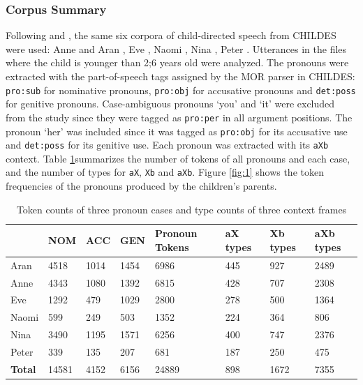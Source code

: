 \subsubsection{Corpus Summary}
Following \citet{mintz2003frequent} and \citet{clair2010learning}, the same six corpora of child-directed speech from CHILDES \cite{macwhinney2014childes} were used: Anne and Aran \cite{theakston2001}, Eve \cite{brown1973first}, Naomi \cite{sachs1983talking}, Nina \cite{suppes1974semantics}, Peter \cite{bloom1974imitation}. Utterances in the files where the child is younger than 2;6 years old were analyzed. The pronouns were extracted with the part-of-speech tags assigned by the MOR parser \cite{macwhinney2012morphosyntactic} in CHILDES: \texttt{pro:sub} for nominative pronouns, \texttt{pro:obj} for accusative pronouns and \texttt{det:poss} for genitive pronouns. Case-ambiguous pronouns `you' and `it' were excluded from the study since they were tagged as \texttt{pro:per} in all argument positions. The pronoun `her' was included since it was tagged as \texttt{pro:obj} for its accusative use and \texttt{det:poss} for its genitive use. Each pronoun was extracted with its \texttt{aXb} context. Table \ref{tab:le1}summarizes the number of tokens of all pronouns and each case, and the number of types for \texttt{aX}, \texttt{Xb} and \texttt{aXb}. Figure \ref{fig:1} shows the token frequencies of the pronouns produced by the children's parents.

\FloatBarrier
\begin{table}[!h]
\centering
\caption{Token counts of three pronoun cases and type counts of three context frames}
\label{tab:le1}
\begin{tabular}{llllllll}
\toprule
 & \textbf{NOM} & \textbf{ACC} & \textbf{GEN} & \textbf{Pronoun Tokens} & \textbf{aX types} & \textbf{Xb types} & \textbf{aXb types} \\ \hline
Aran & 4518 & 1014 & 1454 & 6986 & 445 & 927 & 2489 \\
Anne & 4343 & 1080 & 1392 & 6815 & 428 & 707 & 2308 \\
Eve & 1292 & 479 & 1029 & 2800 & 278 & 500 & 1364 \\
Naomi & 599 & 249 & 503 & 1352 & 224 & 364 & 806 \\
Nina & 3490 & 1195 & 1571 & 6256 & 400 & 747 & 2376 \\
Peter & 339 & 135 & 207 & 681 & 187 & 250 & 475 \\
\textbf{Total} & 14581 & 4152 & 6156 & 24889 & 898 & 1672 & 7355 \\ 
\toprule
\end{tabular}
\end{table}
\FloatBarrier

